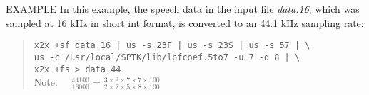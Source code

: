 \begin{qsection}{EXAMPLE}
In this example, the speech data in the input file {\em data.16},
which was sampled at 16 kHz in short int format, is converted to
an 44.1 kHz sampling rate:
\begin{quote}
\verb!x2x +sf data.16 | us -s 23F | us -s 23S | us -s 57 | \! \\
\verb!us -c /usr/local/SPTK/lib/lpfcoef.5to7 -u 7 -d 8 | \! \\
\verb!x2x +fs > data.44! \\ [5mm]
Note:~~
$\displaystyle\frac{44100}{16000} = 
	\frac{3\times3\times7\times7\times100}{2\times2\times5\times8\times100}$
\end{quote}
\end{qsection}


